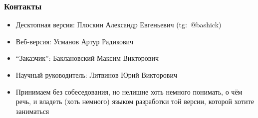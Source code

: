 \documentclass[xetex,mathserif,serif]{beamer}
\begin{document}
    \begin{frame}
        \frametitle{Контакты}
        \begin{itemize}
            \item Десктопная версия: Плоскин Александр Евгеньевич (tg:~@bashick)
            \item Веб-версия: Усманов Артур Радикович
            \item ``Заказчик'': Баклановский Максим Викторович
            \item Научный руководитель: Литвинов Юрий Викторович
            \item Принимаем без собеседования, но нелишне хоть немного понимать, о чём речь, и владеть (хоть немного) языком разработки той версии, которой хотите заниматься
        \end{itemize}
    \end{frame}
\end{document}
